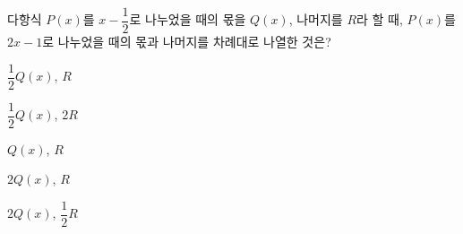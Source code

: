 다항식 $P(x)$를 $x-\dfrac{1}{2}$로 나누었을 때의 몫을 $Q(x)$, 나머지를 $R$라 할 때, $P(x)$를 $2x-1$로 나누었을 때의 몫과 나머지를 차례대로 나열한 것은?
\begin{choicesii}{\rule[-3ex]{0pt}{8ex}$\dfrac{1}{2}Q(x)$, $R$}{\rule[-3ex]{0pt}{8ex}$\dfrac{1}{2}Q(x)$, $2R$}{\rule[-3ex]{0pt}{8ex}$Q(x)$, $R$}{\rule[-3ex]{0pt}{8ex}$2Q(x)$, $R$}{\rule[-3ex]{0pt}{8ex}$2Q(x)$, $\dfrac{1}{2}R$}\end{choicesii}
